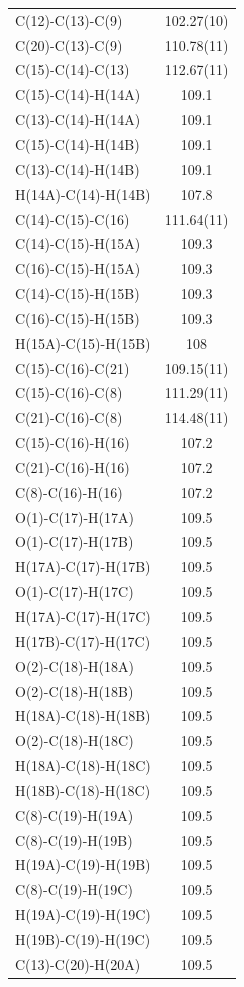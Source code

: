\begin{center}
{\begin{supertabular}{p{1.5in}c}
C(12)-C(13)-C(9)&102.27(10)\\
C(20)-C(13)-C(9)&110.78(11)\\
C(15)-C(14)-C(13)&112.67(11)\\
C(15)-C(14)-H(14A)&109.1\\
C(13)-C(14)-H(14A)&109.1\\
C(15)-C(14)-H(14B)&109.1\\
C(13)-C(14)-H(14B)&109.1\\
H(14A)-C(14)-H(14B)&107.8\\
C(14)-C(15)-C(16)&111.64(11)\\
C(14)-C(15)-H(15A)&109.3\\
C(16)-C(15)-H(15A)&109.3\\
C(14)-C(15)-H(15B)&109.3\\
C(16)-C(15)-H(15B)&109.3\\
H(15A)-C(15)-H(15B)&108\\
C(15)-C(16)-C(21)&109.15(11)\\
C(15)-C(16)-C(8)&111.29(11)\\
C(21)-C(16)-C(8)&114.48(11)\\
C(15)-C(16)-H(16)&107.2\\
C(21)-C(16)-H(16)&107.2\\
C(8)-C(16)-H(16)&107.2\\
O(1)-C(17)-H(17A)&109.5\\
O(1)-C(17)-H(17B)&109.5\\
H(17A)-C(17)-H(17B)&109.5\\
O(1)-C(17)-H(17C)&109.5\\
H(17A)-C(17)-H(17C)&109.5\\
H(17B)-C(17)-H(17C)&109.5\\
O(2)-C(18)-H(18A)&109.5\\
O(2)-C(18)-H(18B)&109.5\\
H(18A)-C(18)-H(18B)&109.5\\
O(2)-C(18)-H(18C)&109.5\\
H(18A)-C(18)-H(18C)&109.5\\
H(18B)-C(18)-H(18C)&109.5\\
C(8)-C(19)-H(19A)&109.5\\
C(8)-C(19)-H(19B)&109.5\\
H(19A)-C(19)-H(19B)&109.5\\
C(8)-C(19)-H(19C)&109.5\\
H(19A)-C(19)-H(19C)&109.5\\
H(19B)-C(19)-H(19C)&109.5\\
C(13)-C(20)-H(20A)&109.5\\

\end{supertabular}}
\end{center}
